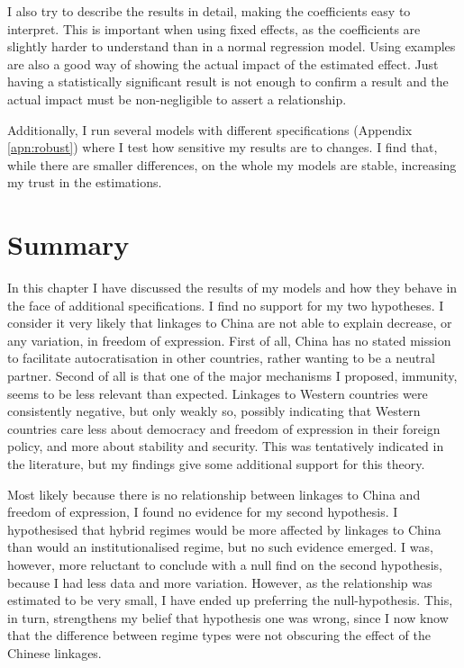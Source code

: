 I also try to describe the results in detail, making the coefficients easy to interpret. This is important when using fixed effects, as the coefficients are slightly harder to understand than in a normal regression model. Using examples are also a good way of showing the actual impact of the estimated effect. Just having a statistically significant result is not enough to confirm a result and the actual impact must be non-negligible to assert a relationship. 

Additionally, I run several models with different specifications (Appendix \ref{apn:robust}) where I test how sensitive my results are to changes. I find that, while there are smaller differences, on the whole my models are stable, increasing my trust in the estimations. 

\section{Summary}
In this chapter I have discussed the results of my models and how they behave in the face of additional specifications. I find no support for my two hypotheses. I consider it very likely that linkages to China are not able to explain decrease, or any variation, in freedom of expression. First of all, China has no stated mission to facilitate autocratisation in other countries, rather wanting to be a neutral partner. Second of all is that one of the major mechanisms I proposed, immunity, seems to be less relevant than expected. Linkages to Western countries were consistently negative, but only weakly so, possibly indicating that Western countries care less about democracy and freedom of expression in their foreign policy, and more about stability and security. This was tentatively indicated in the literature, but my findings give some additional support for this theory.

Most likely because there is no relationship between linkages to China and freedom of expression, I found no evidence for my second hypothesis. I hypothesised that hybrid regimes would be more affected by linkages to China than would an institutionalised regime, but no such evidence emerged. I was, however, more reluctant to conclude with a null find on the second hypothesis, because I had less data and more variation. However, as the relationship was estimated to be very small, I have ended up preferring the null-hypothesis. This, in turn, strengthens my belief that hypothesis one was wrong, since I now know that the difference between regime types were not obscuring the effect of the Chinese linkages.